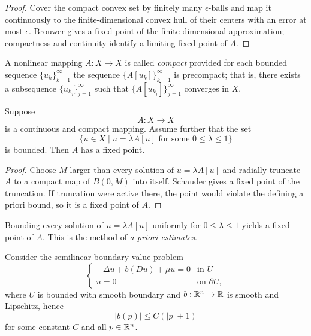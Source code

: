 \begin{proof}
\sketch Cover the compact convex set by finitely many $\epsilon$-balls and map it continuously to the finite-dimensional convex hull of their centers with an error at most $\epsilon$. Brouwer gives a fixed point of the finite-dimensional approximation; compactness and continuity identify a limiting fixed point of $A$.
\end{proof}

\begin{definition}
\label{def:compact-mapping-banach-space}
A nonlinear mapping $A : X \to X$ is called \textit{compact} provided for each bounded sequence $\{u_k\}_{k=1}^{\infty}$ the sequence $\{A[u_k]\}_{k=1}^{\infty}$ is precompact; that is, there exists a subsequence $\{u_{k_j}\}_{j=1}^{\infty}$ such that $\{A[u_{k_j}]\}_{j=1}^{\infty}$ converges in $X$.
\end{definition}

\begin{theorem}
\label{thm:schaefers-fixed-point-theorem}

Suppose
\[
A : X \to X
\]
is a continuous and compact mapping. Assume further that the set
\[
\{u \in X \mid u = \lambda A[u] \text{ for some } 0 \le \lambda \le 1\}
\]
is bounded. Then $A$ has a fixed point.
\end{theorem}

\begin{proof}
\sketch Choose $M$ larger than every solution of $u=\lambda A[u]$ and radially truncate $A$ to a compact map of $B(0,M)$ into itself. Schauder gives a fixed point of the truncation. If truncation were active there, the point would violate the defining a priori bound, so it is a fixed point of $A$.
\end{proof}

\begin{remark}
\label{rem:a-priori-estimates-method}

Bounding every solution of $u=\lambda A[u]$ uniformly for $0\leq\lambda\leq1$ yields a fixed point of $A$. This is the method of \textit{a priori estimates}.
\end{remark}

\begin{example}
\label{ex:quasilinear-elliptic-schaefer}
Consider the semilinear boundary-value problem
\[
\begin{cases}
-\Delta u + b(Du) + \mu u = 0 & \text{in } U \\
u = 0 & \text{on } \partial U,
\end{cases}
\tag{21}
\]
where $U$ is bounded with smooth boundary and $b:\mathbb{R}^n\to\mathbb{R}$ is smooth and Lipschitz, hence
\[
|b(p)| \le C(|p| + 1)
\tag{22}
\]
for some constant $C$ and all $p \in \mathbb{R}^n$.
\end{example}

